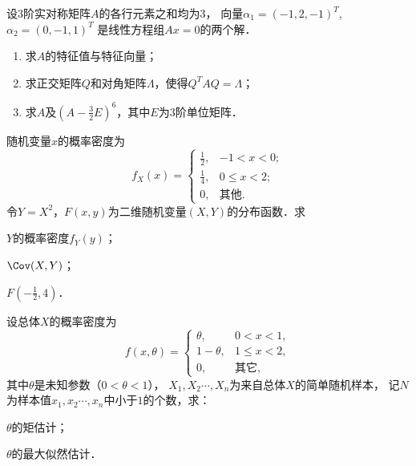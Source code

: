 \documentclass[plain,noanswer,medmath]{../../template/jnuexam}
\begin{document}
\begin{problem}[points=13]%
设$3$阶实对称矩阵$A$的各行元素之和均为$3$，
向量$\alpha_1 = \left(- 1,2, - 1 \right)^T$,$\alpha_2 = \left(0, - 1,1 \right)^T$
是线性方程组$Ax = 0$的两个解．
\begin{enumerate}
\item 求$A$的特征值与特征向量；
\item 求正交矩阵$Q$和对角矩阵$\Lambda$，使得$Q^T AQ = \Lambda$；
\item 求$A$及$\left(A - \frac{3}{2}E \right)^6$，其中$E$为$3$阶单位矩阵．
\end{enumerate}
\end{problem}


\begin{problem}[points=13]%
随机变量$x$的概率密度为
$$f_X(x) = \begin{cases}
  \frac{1}{2}, & -1 < x < 0; \\
  \frac{1}{4}, & 0 \le x < 2; \\
            0, & \text{其他}.
\end{cases}$$
令$Y = X^2$，$F(x,y)$为二维随机变量$(X,Y)$的分布函数．求\par
\begin{enumerate*}
\item $Y$的概率密度$f_Y(y)$；
\item $\Cov(X,Y)$；
\item $F\left(-\frac{1}{2},4\right)$．
\end{enumerate*}
\end{problem}


\begin{problem}[points=13]%
设总体$X$的概率密度为
$$f(x,\theta) = \begin{cases}
      \theta , & 0 < x < 1, \\
  1 - \theta , & 1 \le x < 2, \\
            0, & \text{其它},
\end{cases}$$
其中$\theta$是未知参数（$0 < \theta < 1$），
$X_1,X_2\cdots ,X_{n}$为来自总体$X$的简单随机样本，
记$N$为样本值$x_1,x_2\cdots ,x_n$中小于$1$的个数，求：\par
\begin{enumerate*}
\item $\theta$的矩估计；
\item $\theta$的最大似然估计．
\end{enumerate*}
\end{problem}
\end{document}
